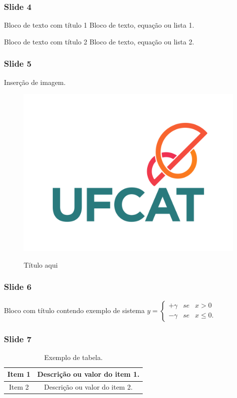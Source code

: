 \documentclass{beamer}
\begin{document}
\begin{frame}
\frametitle{Slide 4}

\begin{block}{Bloco de texto com título 1}
Bloco de texto, equação ou lista 1.
\end{block}

\begin{block}{Bloco de texto com título 2}
Bloco de texto, equação ou lista 2.
\end{block}

\end{frame}

\begin{frame}
\frametitle{Slide 5}

Inserção de imagem.
\begin{figure}[!h]
	\centering
    \caption{Título aqui}
	\includegraphics[width=0.4\linewidth]{Logo_UFCAT.png}
    \label{Citação aqui}
\end{figure}

\end{frame}

\begin{frame}
\frametitle{Slide 6}

\begin{block}{Bloco com título contendo exemplo de sistema}
$
y=\left\{\begin{array}{ccc}
	+ \gamma & se & x > 0\\
	- \gamma & se & x \leq 0.
\end{array}\right.
$
\end{block}
\end{frame}

\begin{frame}
\frametitle{Slide 7}

\begin{table}[!h]
\center
\caption{Exemplo de tabela.}
\begin{tabular}{|c|c|}
\hline 
Item 1 & Descrição ou valor do item 1. \\ 
\hline 
Item 2 & Descrição ou valor do item 2. \\ 
\hline 
\end{tabular} 
\end{table}

\end{frame}
\end{document}
